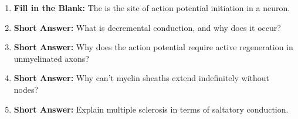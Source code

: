 \begin{enumerate}[label=\textbf{Q2.3.\arabic*}]
      \item \textbf{Fill in the Blank:} The \underline{\hspace{3cm}} is the site of action potential initiation in a neuron. \\

      \item \textbf{Short Answer:} What is decremental conduction, and why does it occur? \\

      \item \textbf{Short Answer:} Why does the action potential require active regeneration in unmyelinated axons? \\

      \item \textbf{Short Answer:} Why can't myelin sheaths extend indefinitely without nodes? \\

      \item \textbf{Short Answer:} Explain multiple sclerosis in terms of saltatory conduction. \\

\end{enumerate}

\squigglyline

